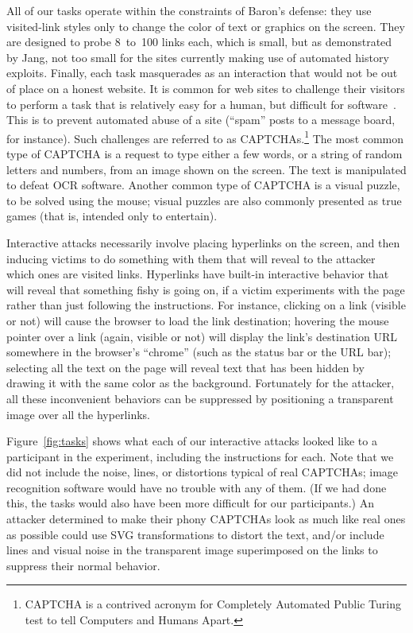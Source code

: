 \documentclass[conference]{IEEEtran}
\begin{document}
All of our tasks operate within the constraints of Baron's defense:
they use visited-link styles only to change the color of text or
graphics on the screen.  They are designed to probe 8~to~100 links
each, which is small, but as demonstrated by Jang, not too small for
the sites currently making use of automated history exploits.
Finally, each task masquerades as an interaction that would not be out
of place on a honest website.  It is common for web sites to challenge
their visitors to perform a task that is relatively easy for a human,
but difficult for software~\cite{ahn03captcha}.  This is to prevent
automated abuse of a site (“spam” posts to a message board, for
instance).  Such challenges are referred to as
CAPTCHAs.\footnote{CAPTCHA is a contrived acronym for Completely
  Automated Public Turing test to tell Computers and Humans Apart.}
The most common type of CAPTCHA is a request to type either a few
words, or a string of random letters and numbers, from an image shown
on the screen.  The text is manipulated to defeat OCR software.
Another common type of CAPTCHA is a visual puzzle, to be solved using
the mouse; visual puzzles are also commonly presented as true games
(that is, intended only to entertain).

Interactive attacks necessarily involve placing hyperlinks on the
screen, and then inducing victims to do something with them that
will reveal to the attacker which ones are visited links.  Hyperlinks
have built-in interactive behavior that will reveal that something
fishy is going on, if a victim experiments with the page rather than
just following the instructions.  For instance, clicking on a link
(visible or not) will cause the browser to load the link destination;
hovering the mouse pointer over a link (again, visible or not) will
display the link's destination URL somewhere in the browser's “chrome”
(such as the status bar or the URL bar); selecting all the text on the
page will reveal text that has been hidden by drawing it with the same
color as the background.  Fortunately for the attacker, all these
inconvenient behaviors can be suppressed by positioning a transparent
image over all the hyperlinks.

Figure~\ref{fig:tasks} shows what each of our interactive attacks
looked like to a participant in the experiment, including the
instructions for each.  Note that we did not include the noise, lines,
or distortions typical of real CAPTCHAs; image recognition software
would have no trouble with any of them.  (If we had done this, the
tasks would also have been more difficult for our participants.)  An
attacker determined to make their phony CAPTCHAs look as much like
real ones as possible could use SVG transformations to distort the
text, and/or include lines and visual noise in the transparent image
superimposed on the links to suppress their normal behavior.
\end{document}
